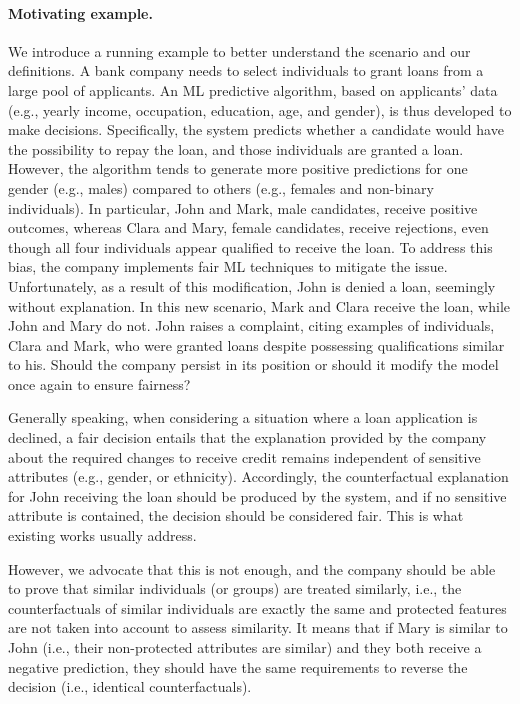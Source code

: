 \documentclass[letterpaper]{article} %
\begin{document}
\paragraph{Motivating example.}
We introduce a running example to better understand the scenario and our definitions. A bank company needs to select individuals to grant loans from a large pool of applicants. An ML predictive algorithm, based on applicants' data (e.g., yearly income, occupation, education, age, and gender), is thus developed to make decisions. Specifically, the system predicts whether a candidate would have the possibility to repay the loan, and those individuals are granted a loan. However, the algorithm tends to generate more positive predictions for one gender (e.g., males) compared to others (e.g., females and non-binary individuals). In particular, John and Mark, male candidates, receive positive outcomes, whereas Clara and Mary, female candidates, receive rejections, even though all four individuals appear qualified to receive the loan. To address this bias, the company implements fair ML techniques to mitigate the issue. Unfortunately, as a result of this modification, John is denied a loan, seemingly without explanation. In this new scenario, Mark and Clara receive the loan, while John and Mary do not. John raises a complaint, citing examples of individuals, Clara and Mark, who were granted loans despite possessing qualifications similar to his. Should the company persist in its position or should it modify the model once again to ensure fairness?

Generally speaking, when considering a situation where a loan application is declined, a fair decision entails that the explanation provided by the company about the required changes to receive credit remains independent of sensitive attributes (e.g., gender, or ethnicity). Accordingly, the counterfactual explanation for John receiving the loan should be produced by the system, and if no sensitive attribute is contained, the decision should be considered fair. This is what existing works usually address.

However, we advocate that this is not enough, and the company should be able to prove that similar individuals (or groups) are treated similarly, i.e., the counterfactuals of similar individuals are exactly the same and protected features are not taken into account to assess similarity. It means that if Mary is similar to John (i.e., their non-protected attributes are similar) and they both receive a negative prediction, they should have the same requirements to reverse the decision (i.e., identical counterfactuals).
\end{document}
